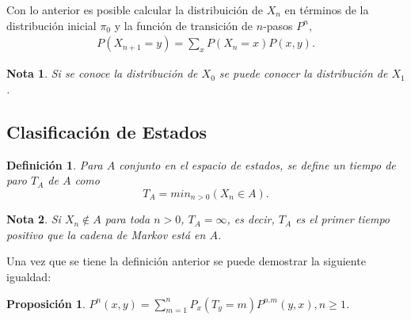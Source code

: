 \documentclass{article}
\newtheorem{Def}{Definición}[section]
\newtheorem{Note}{Nota}[section]
\newtheorem{Prop}{Proposición}[section]
\numberwithin{equation}{section}
\begin{document}
Con lo anterior es posible calcular la distribuici\'on de $X_{n}$ en t\'erminos de la distribuci\'on inicial $\pi_{0}$ y la funci\'on de transici\'on de $n$-pasos $P^{n}$,
\begin{eqnarray}
P\left(X_{n+1}=y\right)=\sum_{x} P\left(X_{n}=x\right)P\left(x,y\right).
\end{eqnarray}
\begin{Note}
Si se conoce la distribuci\'on de $X_{0}$ se puede conocer la distribuci\'on de $X_{1}$.
\end{Note}

\subsection*{Clasificaci\'on de Estados}

\begin{Def}
Para $A$ conjunto en el espacio de estados, se define un tiempo de paro $T_{A}$ de $A$ como
\begin{equation}
T_{A}=min_{n>0}\left(X_{n}\in A\right).
\end{equation}
\end{Def}

\begin{Note}
Si $X_{n}\notin A$ para toda $n>0$, $T_{A}=\infty$, es decir,  $T_{A}$ es el primer tiempo positivo que la cadena de Markov est\'a en $A$.
\end{Note}

Una vez que se tiene la definici\'on anterior se puede demostrar la siguiente igualdad:

\begin{Prop}
$P^{n}\left(x,y\right)=\sum_{m=1}^{n}P_{x}\left(T_{y}=m\right)P^{n.m}\left(y,x\right), n\geq1$.
\end{Prop}
\medskip
\end{document}
